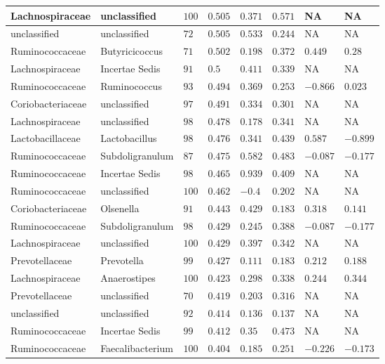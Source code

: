 \begin{table}[!ht]
\begin{tiny}
\begin{tabular}{|l|l|l|l|l|l|l|l|}
Lachnospiraceae & unclassified & $100$ & $0.505$ & $0.371$ & $0.571$ & NA & NA \\ \hline
unclassified & unclassified & $72$ & $0.505$ & $0.533$ & $0.244$ & NA & NA \\ \hline
Ruminococcaceae & Butyricicoccus & $71$ & $0.502$ & $0.198$ & $0.372$ & $0.449$ & $0.28$ \\ \hline
Lachnospiraceae & Incertae Sedis & $91$ & $0.5$ & $0.411$ & $0.339$ & NA & NA \\ \hline
Ruminococcaceae & Ruminococcus & $93$ & $0.494$ & $0.369$ & $0.253$ & $-0.866$ & $0.023$ \\ \hline
Coriobacteriaceae & unclassified & $97$ & $0.491$ & $0.334$ & $0.301$ & NA & NA \\ \hline
Lachnospiraceae & unclassified & $98$ & $0.478$ & $0.178$ & $0.341$ & NA & NA \\ \hline
Lactobacillaceae & Lactobacillus & $98$ & $0.476$ & $0.341$ & $0.439$ & $0.587$ & $-0.899$ \\ \hline
Ruminococcaceae & Subdoligranulum & $87$ & $0.475$ & $0.582$ & $0.483$ & $-0.087$ & $-0.177$ \\ \hline
Ruminococcaceae & Incertae Sedis & $98$ & $0.465$ & $0.939$ & $0.409$ & NA & NA \\ \hline
Ruminococcaceae & unclassified & $100$ & $0.462$ & $-0.4$ & $0.202$ & NA & NA \\ \hline
Coriobacteriaceae & Olsenella & $91$ & $0.443$ & $0.429$ & $0.183$ & $0.318$ & $0.141$ \\ \hline
Ruminococcaceae & Subdoligranulum & $98$ & $0.429$ & $0.245$ & $0.388$ & $-0.087$ & $-0.177$ \\ \hline
Lachnospiraceae & unclassified & $100$ & $0.429$ & $0.397$ & $0.342$ & NA & NA \\ \hline
Prevotellaceae & Prevotella & $99$ & $0.427$ & $0.111$ & $0.183$ & $0.212$ & $0.188$ \\ \hline
Lachnospiraceae & Anaerostipes & $100$ & $0.423$ & $0.298$ & $0.338$ & $0.244$ & $0.344$ \\ \hline
Prevotellaceae & unclassified & $70$ & $0.419$ & $0.203$ & $0.316$ & NA & NA \\ \hline
unclassified & unclassified & $92$ & $0.414$ & $0.136$ & $0.137$ & NA & NA \\ \hline
Ruminococcaceae & Incertae Sedis & $99$ & $0.412$ & $0.35$ & $0.473$ & NA & NA \\ \hline
Ruminococcaceae & Faecalibacterium & $100$ & $0.404$ & $0.185$ & $0.251$ & $-0.226$ & $-0.173$ \\ \hline

\end{tabular}
\end{tiny}
\end{table}
